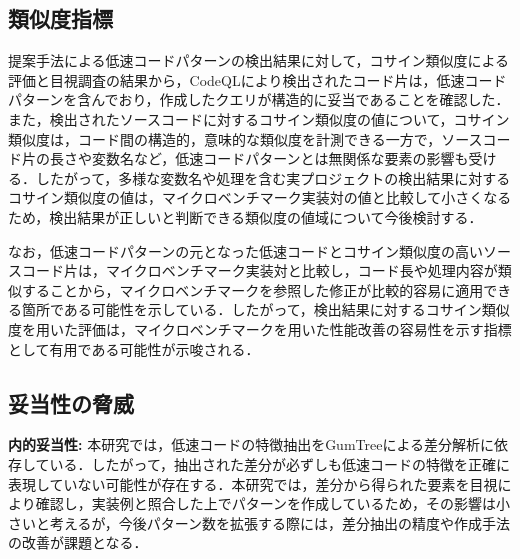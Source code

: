 \documentclass[submit,techrep,noauthor]{ipsj}
\newcommand{\memo}[1]{\colorbox{magenta!30}{{\bf MEMO}:}{\color{red!50} {\textbf{[#1]}}}}
\begin{document}



\subsection{類似度指標}

提案手法による低速コードパターンの検出結果に対して，コサイン類似度による評価と目視調査の結果から，CodeQLにより検出されたコード片は，低速コードパターンを含んでおり，作成したクエリが構造的に妥当であることを確認した．
また，検出されたソースコードに対するコサイン類似度の値について，コサイン類似度は，コード間の構造的，意味的な類似度を計測できる一方で，ソースコード片の長さや変数名など，低速コードパターンとは無関係な要素の影響も受ける．したがって，多様な変数名や処理を含む実プロジェクトの検出結果に対するコサイン類似度の値は，マイクロベンチマーク実装対の値と比較して小さくなるため，検出結果が正しいと判断できる類似度の値域について今後検討する．

なお，低速コードパターンの元となった低速コードとコサイン類似度の高いソースコード片は，マイクロベンチマーク実装対と比較し，コード長や処理内容が類似することから，マイクロベンチマークを参照した修正が比較的容易に適用できる箇所である可能性を示している．したがって，検出結果に対するコサイン類似度を用いた評価は，マイクロベンチマークを用いた性能改善の容易性を示す指標として有用である可能性が示唆される．


\subsection{妥当性の脅威}

\noindent\textbf{内的妥当性: }
本研究では，低速コードの特徴抽出をGumTreeによる差分解析に依存している．したがって，抽出された差分が必ずしも低速コードの特徴を正確に表現していない可能性が存在する．本研究では，差分から得られた要素を目視により確認し，実装例と照合した上でパターンを作成しているため，その影響は小さいと考えるが，今後パターン数を拡張する際には，差分抽出の精度や作成手法の改善が課題となる．
\end{document}
